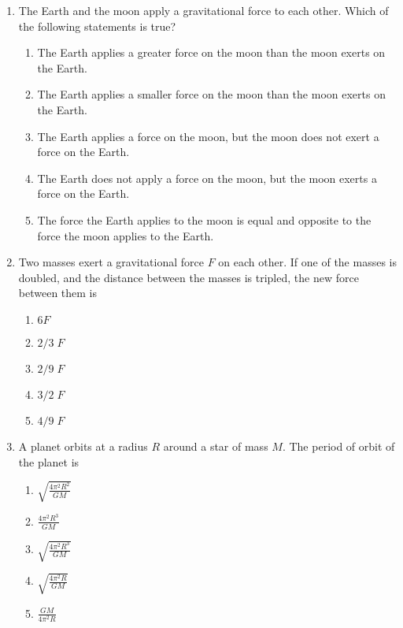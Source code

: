 \documentclass{../../oss-apphys}
\begin{document}
\begin{multicols}{2}
\begin{enumerate}[leftmargin=18pt,start=8]
  \item The Earth and the moon apply a gravitational force to each other.
    Which of the following statements is true?
    \begin{enumerate}[noitemsep,topsep=0pt,leftmargin=18pt]  
    \item The Earth applies a greater force on the moon than the moon exerts on
      the Earth.
    \item The Earth applies a smaller force on the moon than the moon exerts on
      the Earth.
    \item The Earth applies a force on the moon, but the moon does not exert a
      force on the Earth.
    \item The Earth does not apply a force on the moon, but the moon exerts a
      force on the Earth.
    \item The force the Earth applies to the moon is equal and opposite to the
      force the moon applies to the Earth.
    \end{enumerate}

    \columnbreak
    
  \item Two masses exert a gravitational force $F$ on each other. If one of the
    masses is doubled, and the distance between the masses is tripled, the
    new force between them is
    \begin{enumerate}[noitemsep,topsep=0pt,leftmargin=18pt]  
    \item $6F$
    \item $2/3\;F$
    \item $2/9\;F$
    \item $3/2\;F$
    \item $4/9\;F$
    \end{enumerate}

  \item A planet orbits at a radius $R$ around a star of mass $M$. The period of
    orbit of the planet is
    \begin{enumerate}[noitemsep,topsep=0pt,leftmargin=18pt]  
    \item $\displaystyle\sqrt{\frac{4\pi^2R^2}{GM}}$
    \item $\displaystyle\frac{4\pi^2R^3}{GM}$
    \item $\displaystyle\sqrt{\frac{4\pi^2R^3}{GM}}$
    \item $\displaystyle\sqrt{\frac{4\pi^2R}{GM}}$
    \item $\displaystyle\frac{GM}{4\pi^2R}$
    \end{enumerate}
  

\end{enumerate}
\end{multicols}
\end{document}
